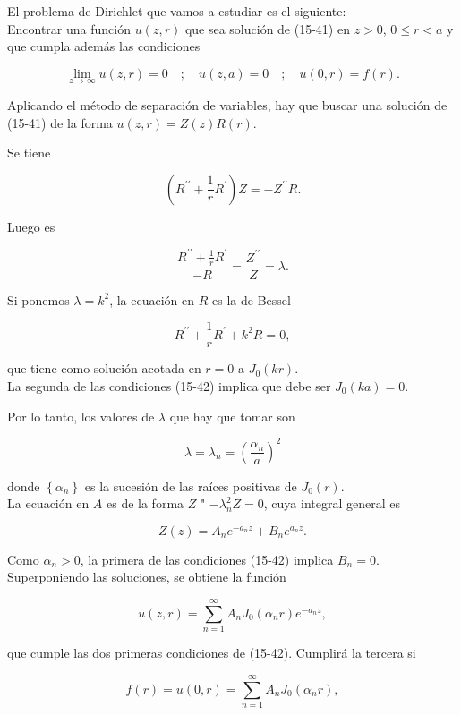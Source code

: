 \documentclass[10pt]{article}
\theoremstyle{plain}
\theoremstyle{definition}
\theoremstyle{remark}
\begin{document}
El problema de Dirichlet que vamos a estudiar es el siguiente:\\
Encontrar una función $u(z, r)$ que sea solución de (15-41) en $z>0$, $0 \leqslant r<a$ y que cumpla además las condiciones


\begin{equation*}
\lim _{z \rightarrow \infty} u(z, r)=0 \quad ; \quad u(z, a)=0 \quad ; \quad u(0, r)=f(r) . \tag{15-42}
\end{equation*}


Aplicando el método de separación de variables, hay que buscar una solución de (15-41) de la forma $u(z, r)=Z(z) R(r)$.

Se tiene

$$
\left(R^{\prime \prime}+\frac{1}{r} R^{\prime}\right) Z=-Z^{\prime \prime} R .
$$

Luego es

$$
\frac{R^{\prime \prime}+\frac{1}{r} R^{\prime}}{-R}=\frac{Z^{\prime \prime}}{Z}=\lambda .
$$

Si ponemos $\lambda=k^{2}$, la ecuación en $R$ es la de Bessel

$$
R^{\prime \prime}+\frac{1}{r} R^{\prime}+k^{2} R=0,
$$

que tiene como solución acotada en $r=0$ a $J_{0}(k r)$.\\
La segunda de las condiciones (15-42) implica que debe ser $J_{0}(k a)=0$.

Por lo tanto, los valores de $\lambda$ que hay que tomar son

$$
\lambda=\lambda_{n}=\left(\frac{\alpha_{n}}{a}\right)^{2}
$$

donde $\left\{\alpha_{n}\right\}$ es la sucesión de las raíces positivas de $J_{0}(r)$.\\
La ecuación en $A$ es de la forma $Z$ " $-\lambda_{n}^{2} Z=0$, cuya integral general es

$$
Z(z)=A_{n} e^{-a_{n} z}+B_{n} e^{a_{n} z} .
$$

Como $\alpha_{n}>0$, la primera de las condiciones (15-42) implica $B_{n}=0$. Superponiendo las soluciones, se obtiene la función


\begin{equation*}
u(z, r)=\sum_{n=1}^{\infty} A_{n} J_{0}\left(\alpha_{n} r\right) e^{-a_{n} z}, \tag{15-43}
\end{equation*}


que cumple las dos primeras condiciones de (15-42). Cumplirá la tercera si

$$
f(r)=u(0, r)=\sum_{n=1}^{\infty} A_{n} J_{0}\left(\alpha_{n} r\right),
$$
\end{document}
